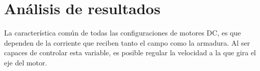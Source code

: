 \section{An\'alisis de resultados}
La caracter\'istica com\'un de todas las configuraciones de motores DC, es que dependen de la corriente
que reciben tanto el campo como la armadura. Al ser capaces de controlar esta variable, es posible regular
la velocidad a la que gira el eje del motor.
